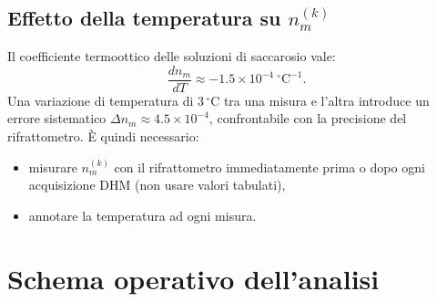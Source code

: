\subsection{Effetto della temperatura su $n_m^{(k)}$}

Il coefficiente termoottico delle soluzioni di saccarosio vale:
\[
  \frac{dn_m}{dT} \approx -1.5 \times 10^{-4}\ ^\circ\text{C}^{-1}.
\]
Una variazione di temperatura di $3\,^\circ\text{C}$ tra una misura e l'altra
introduce un errore sistematico $\Delta n_m \approx 4.5 \times 10^{-4}$,
confrontabile con la precisione del rifrattometro. È quindi necessario:
\begin{itemize}
  \item misurare $n_m^{(k)}$ con il rifrattometro immediatamente prima o dopo
        ogni acquisizione DHM (non usare valori tabulati),
  \item annotare la temperatura ad ogni misura.
\end{itemize}

\section{Schema operativo dell'analisi}

